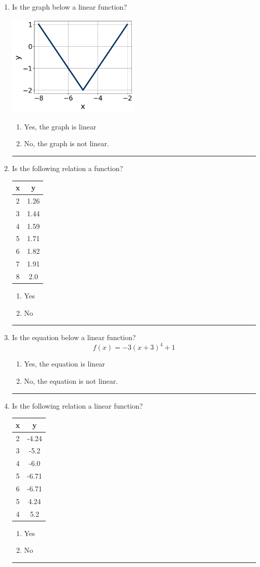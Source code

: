 \documentclass[14pt]{extbook}
\newcommand{\litem}[1]{\item#1\hspace*{-1cm}\rule{\textwidth}{0.4pt}}
\begin{document}
\begin{enumerate}
{\begin{enumerate}[label=\Alph*.]
\end{enumerate} }
\litem{
Is the graph below a linear function?
\begin{center}
    \includegraphics[width=0.5\textwidth]{../Figures/MA_8_F_1_2_graphQ.png}
\end{center}
\begin{enumerate}[label=\Alph*.]
\item Yes, the graph is linear
\item No, the graph is not linear.

\end{enumerate} }
\litem{
Is the following relation a function?

\begin{tabular}{c|c}
x &y\tabularnewline \hline
2 &1.26\tabularnewline \hline
3 &1.44\tabularnewline \hline
4 &1.59\tabularnewline \hline
5 &1.71\tabularnewline \hline
6 &1.82\tabularnewline \hline
7 &1.91\tabularnewline \hline
8 &2.0\end{tabular}\begin{enumerate}[label=\Alph*.]
\item Yes
\item No

\end{enumerate} }
\litem{
Is the equation below a linear function?\[ f(x) = -3(x + 3)^4+1 \]\begin{enumerate}[label=\Alph*.]
\item Yes, the equation is linear
\item No, the equation is not linear.

\end{enumerate} }
\litem{
Is the following relation a linear function?

\begin{tabular}{c|c}
x &y\tabularnewline \hline
2 &-4.24\tabularnewline \hline
3 &-5.2\tabularnewline \hline
4 &-6.0\tabularnewline \hline
5 &-6.71\tabularnewline \hline
6 &-6.71\tabularnewline \hline
5 &4.24\tabularnewline \hline
4 &5.2\end{tabular}\begin{enumerate}[label=\Alph*.]
\item Yes
\item No


\end{enumerate}}
\end{enumerate}
\end{document}
